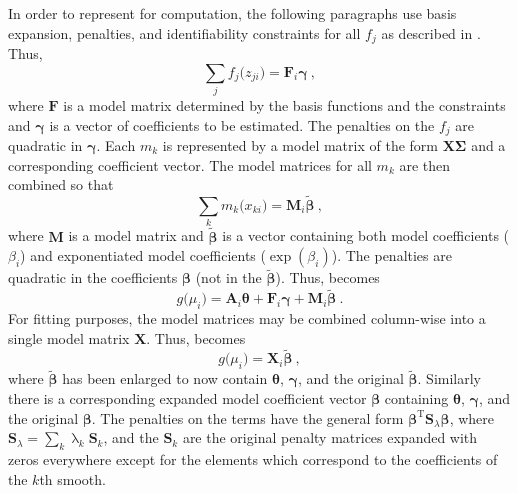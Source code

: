 In order to represent  for computation, the following paragraphs use basis expansion, penalties, and identifiability constraints for all \(f_j\) as described in \textcite{Wood2006}.  Thus, 
\begin{equation}
  \label{eq:SCAMCombinedModelMatricesfk}
  \sum_j f_j\bigl(z_{j i}\bigr) = \symbf{F}_i \symbf{\gamma}~,
\end{equation}
where \(\symbf{F}\) is a model matrix determined by the basis functions and the constraints and \(\symbf{\gamma}\) is a vector of coefficients to be estimated.  The penalties on the \(f_j\) are quadratic in \(\symbf{\gamma}\).  Each \(m_k\) is represented by a model matrix of the form \(\symbf{X} \symbf{\Sigma}\) and a corresponding coefficient vector.  The model matrices for all \(m_k\) are then combined so that
\begin{equation}
  \label{eq:SCAMCombinedModelMatricesMk}
  \sum_k m_k\bigl(x_{k i}\bigr) = \symbf{M}_i \tilde{\symbf{\beta}}~,
\end{equation}
where \(\symbf{M}\) is a model matrix and \(\tilde{\symbf{\beta}}\) is a vector containing both model coefficients (\(\beta_i\)) and exponentiated model coefficients (\(\exp(\beta_i)\)).  The penalties are quadratic in the coefficients \(\symbf{\beta}\) (not in the \(\tilde{\symbf{\beta}}\)).  Thus,  becomes
\begin{equation}
  \label{eq:SCAMComputationalRepresentation01}
  g\bigl(\mu_i\bigr) = \symbf{A}_i \symbf{\theta} + \symbf{F}_i \symbf{\gamma} + \symbf{M}_i \tilde{\symbf{\beta}}~.
\end{equation}
For fitting purposes, the model matrices may be combined column-wise into a single model matrix \(\symbf{X}\). Thus,  becomes
\begin{equation}
  \label{eq:SCAMComputationalRepresentation02}
  g\bigl(\mu_i\bigr) = \symbf{X}_i \tilde{\symbf{\beta}}~,
\end{equation}
where \(\tilde{\symbf{\beta}}\) has been enlarged to now contain \(\symbf{\theta}\), \(\symbf{\gamma}\), and the original \(\tilde{\symbf{\beta}}\).  Similarly there is a corresponding expanded model coefficient vector \(\symbf{\beta}\) containing \(\symbf{\theta}\), \(\symbf{\gamma}\), and the original \(\symbf{\beta}\).  The penalties on the terms have the general form \(\symbf{\beta}^{\text{T}} \symbf{S}_\lambda \symbf{\beta}\), where \(\symbf{S}_\lambda = \sum_k \uplambda_k \symbf{S}_k\), and the \(\symbf{S}_k\) are the original penalty matrices expanded with zeros everywhere except for the elements which correspond to the coefficients of the \(k\)th smooth.


